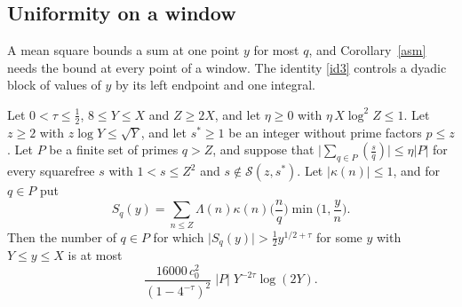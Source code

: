 \subsection{Uniformity on a window}

A mean square bounds a sum at one point $y$ for most $q$, and Corollary~\ref{asm} needs the bound at every point of a window. The identity \eqref{id3} controls a dyadic block of values of $y$ by its left endpoint and one integral.

\begin{proposition}\label{window}
Let $0<\tau\le\frac12$, $8\le Y\le X$ and $Z\ge2X$, and let $\eta\ge0$ with $\eta\,X\log^2Z\le1$. Let $z\ge2$ with $z\log Y\le\sqrt Y$, and let $s^\ast\ge1$ be an integer without prime factors $p\le z$. Let $P$ be a finite set of primes $q>Z$, and suppose that $\lvert\sum_{q\in P}(\frac sq)\rvert\le\eta\lvert P\rvert$ for every squarefree $s$ with $1<s\le Z^2$ and $s\notin\mathcal S(z,s^\ast)$. Let $\lvert\kappa(n)\rvert\le1$, and for $q\in P$ put
\[
S_q(y)=\sum_{n\le Z}\Lambda(n)\kappa(n)\Big(\frac nq\Big)\min\Big(1,\frac yn\Big).
\]
Then the number of $q\in P$ for which $\lvert S_q(y)\rvert>\frac12y^{1/2+\tau}$ for some $y$ with $Y\le y\le X$ is at most
\[
\frac{16000\,c_0^2}{(1-4^{-\tau})^2}\;\lvert P\rvert\;Y^{-2\tau}\log(2Y).
\]
\end{proposition}


